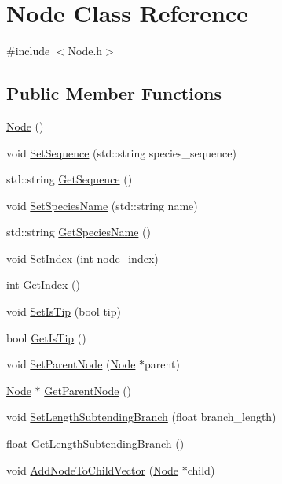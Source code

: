 \hypertarget{classNode}{}\section{Node Class Reference}
\label{classNode}


{\ttfamily \#include $<$Node.\+h$>$}

\subsection*{Public Member Functions}
\begin{DoxyCompactItemize}
\item 
\hyperlink{classNode_ad7a34779cad45d997bfd6d3d8043c75f}{Node} ()
\item 
void \hyperlink{classNode_af92559fbef1938022d59b2902703afaa}{Set\+Sequence} (std\+::string species\+\_\+sequence)
\item 
std\+::string \hyperlink{classNode_a69f309f68de4f08e950a15ae79571ec0}{Get\+Sequence} ()
\item 
void \hyperlink{classNode_af4ba012237c10c42f2118e629633b844}{Set\+Species\+Name} (std\+::string name)
\item 
std\+::string \hyperlink{classNode_a9787fabf589f2b0764482b41091f775b}{Get\+Species\+Name} ()
\item 
void \hyperlink{classNode_a6f2acc7b954108a6fe266838fce50ef6}{Set\+Index} (int node\+\_\+index)
\item 
int \hyperlink{classNode_a90ff01054aa65ec8338b78a792ea4bfe}{Get\+Index} ()
\item 
void \hyperlink{classNode_a89bff92e3930d521439395ccf332418f}{Set\+Is\+Tip} (bool tip)
\item 
bool \hyperlink{classNode_ac2902fa01a9ebbeb692fe16d75bd6be2}{Get\+Is\+Tip} ()
\item 
void \hyperlink{classNode_acb22b8f28ca70e1316a6bafc375ee352}{Set\+Parent\+Node} (\hyperlink{classNode}{Node} $\ast$parent)
\item 
\hyperlink{classNode}{Node} $\ast$ \hyperlink{classNode_a032d93c17743138203c77c721edfdae6}{Get\+Parent\+Node} ()
\item 
void \hyperlink{classNode_a9d7592d6bf479825eb411a244f4d7ad2}{Set\+Length\+Subtending\+Branch} (float branch\+\_\+length)
\item 
float \hyperlink{classNode_a7e55b2011625f394b8b08310b8cf45dc}{Get\+Length\+Subtending\+Branch} ()
\item 
void \hyperlink{classNode_aef73af92aa3046218f83ed67a7996188}{Add\+Node\+To\+Child\+Vector} (\hyperlink{classNode}{Node} $\ast$child)

\end{DoxyCompactItemize}
